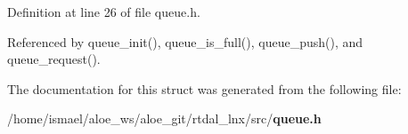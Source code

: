Definition at line 26 of file queue.\-h.



Referenced by queue\-\_\-init(), queue\-\_\-is\-\_\-full(), queue\-\_\-push(), and queue\-\_\-request().



The documentation for this struct was generated from the following file\-:\begin{DoxyCompactItemize}
\item 
/home/ismael/aloe\-\_\-ws/aloe\-\_\-git/rtdal\-\_\-lnx/src/{\bf queue.\-h}\end{DoxyCompactItemize}
